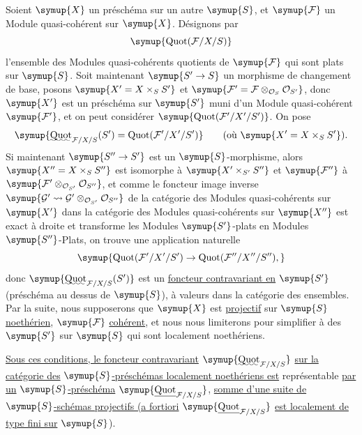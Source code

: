 Soient $\symup{X}$ un préschéma sur un autre $\symup{S}$, et $\symup{\mathcal F}$ un Module
quasi-cohérent sur $\symup{X}$. Désignons par
\[
\symup{\operatorname{Quot}(\mathcal F/X/S)}
\]
l'ensemble des Modules quasi-cohérents quotients de $\symup{\mathcal F}$ qui sont plats
sur $\symup{S}$. Soit maintenant $\symup{S'\to S}$ un morphisme de changement de
base, posons $\symup{X'=X\times_S S'}$ et
$\symup{\mathcal F'=\mathcal F\otimes_{\mathcal O_S}\mathcal O_{S'}}$, donc $\symup{X'}$ est
un préschéma sur $\symup{S'}$ muni d'un Module
quasi-cohérent $\symup{\mathcal F'}$, et on peut considérer
$\symup{\operatorname{Quot}(\mathcal F'/X'/S')}$. On pose
\[
\symup{\mathop{\text{\uwave{Quot}}}\nolimits_{\mathcal F/X/S}(S')
=\operatorname{Quot}(\mathcal F'/X'/S')}
\qquad\text{(où $\symup{X'=X\times_SS'}$)}.
\]
Si maintenant $\symup{S''\to S'}$ est un $\symup{S}$-morphisme, alors
$\symup{X''=X\times_SS''}$ est isomorphe à $\symup{X'\times_{S'}S''}$ et $\symup{\mathcal F''}$ à
$\symup{\mathcal F'\otimes_{\mathcal O_{S'}}\mathcal O_{S''}}$, et comme le foncteur
image inverse
$\symup{\mathcal G'\rightsquigarrow\mathcal G'\otimes_{\mathcal O_{S'}}\mathcal O_{S''}}$
de la catégorie des Modules quasi-cohérents sur $\symup{X'}$ dans la catégorie des
Modules quasi-cohérents sur $\symup{X''}$ est exact à droite et transforme les Modules
$\symup{S'}$-plats en Modules $\symup{S''}$-Plats, on trouve une application naturelle
\[
\symup{\operatorname{Quot}(\mathcal F'/X'/S')\to
\operatorname{Quot}(\mathcal F''/X''/S''),}
\]
donc $\symup{\mathop{\text{\uwave{Quot}}}\nolimits_{\mathcal F/X/S}(S')}$ est un \uline{foncteur
contravariant en} $\symup{S'}$ (préschéma au dessus de $\symup{S}$), à valeurs dans la catégorie
des ensembles. Par la suite, nous supposerons que $\symup{X}$ est \uline{projectif} sur $\symup{S}$
\uline{noethérien}, $\symup{\mathcal F}$ \uline{cohérent}, et nous nous limiterons pour simplifier à
des $\symup{S'}$ sur $\symup{S}$ qui sont localement noethériens.

 \uline{Sous ces conditions, le foncteur contravariant}
$\symup{\mathop{\text{\uwave{Quot}}}\nolimits_{\mathcal F/X/S}}$ \uline{sur la catégorie des}
$\symup{S}$\uline{-préschémas localement noethériens est} représentable \uline{par un} $\symup{S}$\uline{-préschéma}
$\symup{\underline{\operatorname{Quot}}_{\mathcal F/X/S}}$, \uline{somme d'une suite de} $\symup{S}$\uline{-schémas
projectifs (a fortiori} $\symup{\underline{\operatorname{Quot}}_{\mathcal F/X/S}}$ \uline{est localement de
type fini sur} $\symup{S}$).

